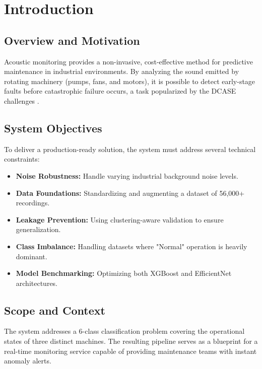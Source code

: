 \chapter{Introduction}

\section{Overview and Motivation}
Acoustic monitoring provides a non-invasive, cost-effective method for predictive maintenance in industrial environments. By analyzing the sound emitted by rotating machinery (pumps, fans, and motors), it is possible to detect early-stage faults before catastrophic failure occurs, a task popularized by the DCASE challenges \cite{dcase2021}.

\section{System Objectives}
To deliver a production-ready solution, the system must address several technical constraints:
\begin{itemize}
    \item \textbf{Noise Robustness:} Handle varying industrial background noise levels.
    \item \textbf{Data Foundations:} Standardizing and augmenting a dataset of 56,000+ recordings.
    \item \textbf{Leakage Prevention:} Using clustering-aware validation to ensure generalization.
    \item \textbf{Class Imbalance:} Handling datasets where "Normal" operation is heavily dominant.
    \item \textbf{Model Benchmarking:} Optimizing both XGBoost and EfficientNet architectures.
\end{itemize}

\section{Scope and Context}
The system addresses a 6-class classification problem covering the operational states of three distinct machines. The resulting pipeline serves as a blueprint for a real-time monitoring service capable of providing maintenance teams with instant anomaly alerts.
